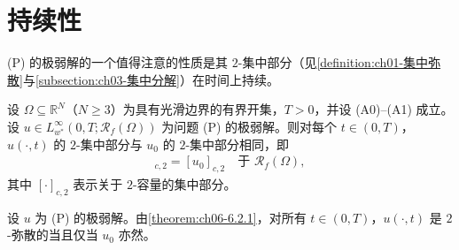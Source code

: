\documentclass[../../main.tex]{subfiles}%
\begin{document}
\section{持续性}\label{section:ch06-持续性}

(P) 的极弱解的一个值得注意的性质是其 $2$-集中部分（见\cref{definition:ch01-集中弥散}与\cref{subsection:ch03-集中分解}）在时间上持续。
\begin{theorem}\label{theorem:ch06-6.2.1}
设 $\Omega\subseteq\mathbb{R}^N$（$N\geqslant3$）为具有光滑边界的有界开集，$T>0$，并设 (A0)--(A1) 成立。设 $u\in L^\infty_{w^*}(0,T;\mathscr{R}_f(\Omega))$ 为问题 (P) 的极弱解。则对每个 $t\in(0,T)$，$u(\cdot,t)$ 的 $2$-集中部分与 $u_0$ 的 $2$-集中部分相同，即
\begin{align}
[u(\cdot,t)]_{c,2}=[u_0]_{c,2} \quad\text{于 }\mathscr{R}_f(\Omega), \label{align:ch6-6.12}
\end{align}
其中 $[\cdot]_{c,2}$ 表示关于 $2$-容量的集中部分。
\end{theorem}

\begin{remark}\label{remark:ch06-6.2.1}
设 $u$ 为 (P) 的极弱解。由\cref{theorem:ch06-6.2.1}，对所有 $t\in(0,T)$，$u(\cdot,t)$ 是 $2$-弥散的当且仅当 $u_0$ 亦然。
\end{remark}
\end{document}
